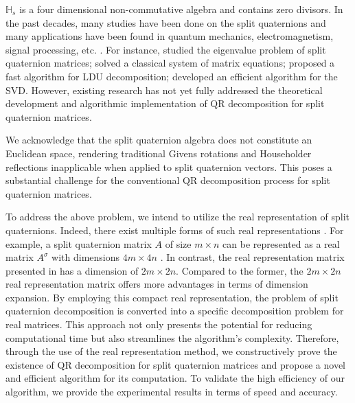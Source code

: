 \documentclass[conference]{IEEEtran}
\numberwithin{equation}{section}
\begin{document}
 $\mathbb{H}_s$ is a four dimensional non-commutative algebra and contains zero divisors. 
  In the past decades, many studies have been done on the split quaternions \cite{AR2020,Yasemin2012,TJiang2015,Jiang2018,TJiang2018,Zhuo2020,Yang2020,mma2023,wang2024,Wang2021,Gang2024,yuan2017,Zhang2015} and  many applications have been found in quantum mechanics, electromagnetism, signal processing, etc. \cite{Gog2022, Hasebe2010, Z2022, Wang2023}. For instance, \cite{Jiang2018} studied the eigenvalue problem of split quaternion matrices; \cite{wang2024} solved a classical system of matrix equations; 
 \cite{Wang2021} proposed a fast algorithm for LDU decomposition; \cite{Gang2024} developed an efficient algorithm for the SVD. However, existing research has not yet fully addressed the theoretical development and algorithmic implementation of QR decomposition for split quaternion matrices.
 
We acknowledge that the split quaternion algebra does not constitute an Euclidean space, rendering traditional Givens rotations and Householder reflections inapplicable when applied to split quaternion vectors. This poses a substantial challenge for the conventional QR decomposition process for split quaternion matrices.

To address the above problem, we intend to utilize the real representation of split quaternions. Indeed, there exist multiple forms of such real representations \cite{Zhuo2020, Yang2020, Xin2019, Gang2024}. For example,  a split quaternion matrix $A$ of size $m \times n$  can be represented as a real matrix $A^\sigma$ 
  with dimensions $4m \times 4n$ \cite{Xin2019}. In contrast, the real representation matrix presented in \cite{Gang2024} has a dimension of $2m \times 2n$. Compared to the former, the $2m \times 2n$ real representation matrix offers more advantages in terms of dimension expansion. By employing this compact real representation, the  problem of split quaternion decomposition is converted into a specific decomposition problem for real matrices. This approach not only presents the potential for reducing computational time but also streamlines the algorithm's complexity. Therefore, through the use of the real representation method, 
we constructively prove the existence of QR decomposition for split quaternion matrices and propose a novel and efficient algorithm for its computation. To validate the high efficiency of our algorithm, we provide the experimental results in terms of speed and accuracy.
\end{document}

